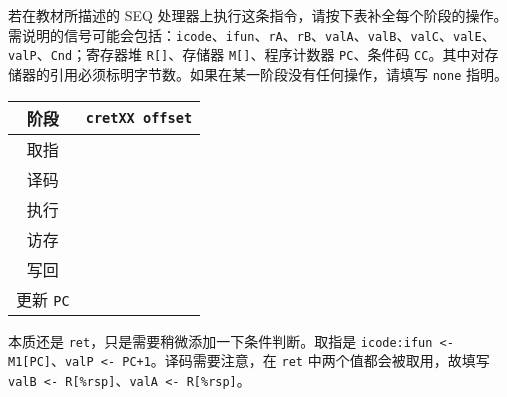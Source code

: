 \begin{problems}
        若在教材所描述的 SEQ 处理器上执行这条指令，请按下表补全每个阶段的操作。需说明的信号可能会包括：\verb|icode|、\verb|ifun|、\verb|rA|、\verb|rB|、\verb|valA|、\verb|valB|、\verb|valC|、\verb|valE|、\verb|valP|、\verb|Cnd|；寄存器堆 \verb|R[]|、存储器 \verb|M[]|、程序计数器 \verb|PC|、条件码 \verb|CC|。其中对存储器的引用必须标明字节数。如果在某一阶段没有任何操作，请填写 \texttt{none} 指明。
        \begin{table}[H]
            \centering
            \begin{tabular}{|c|c|}
                \hline
                阶段 & {\qquad \qquad \qquad \qquad} \verb|cretXX offset| {\qquad \qquad \qquad \qquad} \\ \hline
                取指 & \rule{0pt}{10ex} \\ \hline
                译码 & \rule{0pt}{10ex} \\ \hline
                执行 & \rule{0pt}{10ex} \\ \hline
                访存 & \rule{0pt}{10ex} \\ \hline
                写回 & \rule{0pt}{10ex} \\ \hline
                更新 \verb|PC| & \rule{0pt}{10ex} \\ \hline
            \end{tabular}
        \end{table}
        \sol 本质还是 \verb|ret|，只是需要稍微添加一下条件判断。取指是 \verb|icode:ifun <- M1[PC]|、\verb|valP <- PC+1|。译码需要注意，在 \verb|ret| 中两个值都会被取用，故填写 \verb|valB <- R[%rsp]|、\verb|valA <- R[%rsp]|。
        

\end{problems}
